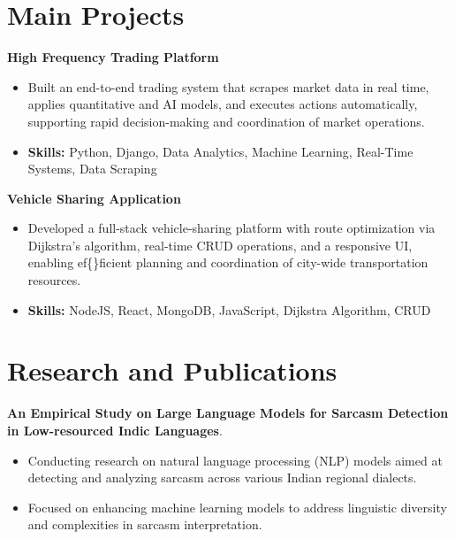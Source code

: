 \documentclass[a4paper,11pt]{article}
\begin{document}
\section{\textbf{Main Projects}}

\vspace{1mm}
  \textbf{High Frequency Trading Platform  }
\vspace{-1.5mm} %
\begin{itemize}
  \item Built an end-to-end trading system that scrapes market data in real time, applies quantitative and AI models, and executes actions automatically, supporting rapid decision-making and coordination of market operations.
\vspace{-3mm}
  \item \textbf{Skills:} Python, Django, Data Analytics, Machine Learning, Real-Time Systems, Data Scraping
\end{itemize}


\vspace{1mm}
   \textbf{Vehicle Sharing Application }
\vspace{-1.5mm} %
\begin{itemize}
  \item Developed a full-stack vehicle-sharing platform with route optimization via Dijkstra's algorithm, real-time CRUD operations, and a responsive UI, enabling ef\{\}ficient planning and coordination of city-wide transportation resources.
\vspace{-3mm}
  \item \textbf{Skills:} NodeJS, React, MongoDB, JavaScript, Dijkstra Algorithm, CRUD
\end{itemize}



\section{\textbf{Research and Publications} \hfill }
\vspace{1mm}
  \textbf{An Empirical Study on Large Language Models for Sarcasm Detection in Low-resourced Indic Languages}.
\vspace{-1mm} %
\begin{itemize}
  \item Conducting research on natural language processing (NLP) models aimed at detecting and analyzing sarcasm across various Indian regional dialects.
\vspace{-3mm}
  \item Focused on enhancing machine learning models to address linguistic diversity and complexities in sarcasm interpretation.
\end{itemize}
\end{document}
